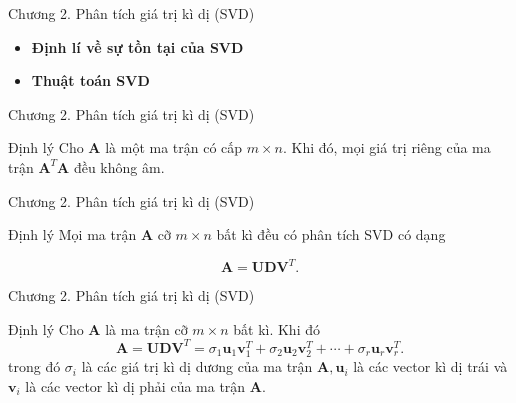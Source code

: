 \documentclass[notheorems,envcountsect,hyperref=unicode]{beamer}
\newcommand{\N}{\mathbb N}
\def\N{\mathbb{N}}
\def\lo{\ell_{\infty}}
\begin{document}

\begin{frame}{Chương 2. Phân tích giá trị kì dị (SVD)}
\begin{itemize}
\item \textbf{Định lí về sự tồn tại của SVD }
\item \textbf{Thuật toán SVD}
\end{itemize}
\end{frame}
\begin{frame}{Chương 2. Phân tích giá trị kì dị (SVD)}
	\begin{block}{\textnormal{Định lý}} Cho $\mathbf{A}$ là một ma trận có cấp $m \times n$. Khi đó, mọi giá trị riêng của ma trận $\mathbf{A}^{T} \mathbf{A}$ đều không âm.
	\end{block}
	
\end{frame}

\begin{frame}{Chương 2. Phân tích giá trị kì dị (SVD)}
\begin{block}{\textnormal{Định lý}}
Mọi ma trận $\mathbf{A}$ cỡ $m \times n$ bất kì đều có phân tích SVD có dạng

\begin{equation*}
	\mathbf{A}=\mathbf{U D V}^{T}.
\end{equation*}
\end{block}

\end{frame}

\begin{frame}{Chương 2. Phân tích giá trị kì dị (SVD)}
\begin{block}{\textnormal{Định lý}}
Cho $\mathbf{A}$ là ma trận cỡ $m \times n$ bất kì. Khi đó
\begin{equation*} \label{eq_4}
	\mathbf{A}=\mathbf{U D V}^{T}=\sigma_{1} \mathbf{u}_{1} \mathbf{v}_{1}^{T}+\sigma_{2} \mathbf{u}_{2} \mathbf{v}_{2}^{T}+\cdots+\sigma_{r} \mathbf{u}_{r} \mathbf{v}_{r}^{T}.
\end{equation*}
trong đó $\sigma_{i}$ là các giá trị kì dị dương của ma trận $\mathbf{A}, \mathbf{u}_{i}$ là các vector kì dị trái và $\mathbf{v}_{i}$ là các vector kì dị phải của ma trận $\mathbf{A}$.
\end{block}
\end{frame}
\end{document}
